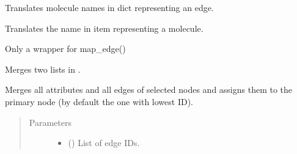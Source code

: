 \documentclass[letterpaper,10pt,english]{sphinxmanual}
\begin{document}
\begin{fulllineitems}
\begin{fulllineitems}
\end{fulllineitems}


\begin{fulllineitems}
\label{\detokenize{main:pypath.main.PyPath.map_edge}}
Translates molecule names in dict representing an edge.

\end{fulllineitems}


\begin{fulllineitems}
\label{\detokenize{main:pypath.main.PyPath.map_item}}
Translates the name in item representing a molecule.

\end{fulllineitems}


\begin{fulllineitems}
\label{\detokenize{main:pypath.main.PyPath.map_list}}
Only a wrapper for map\_edge()

\end{fulllineitems}


\begin{fulllineitems}
\label{\detokenize{main:pypath.main.PyPath.merge_lists}}
Merges two lists in .

\end{fulllineitems}


\begin{fulllineitems}
\label{\detokenize{main:pypath.main.PyPath.merge_nodes}}
Merges all attributes and all edges of selected nodes
and assigns them to the primary node
(by default the one with lowest ID).
\begin{quote}\begin{description}
\item[{Parameters}] \leavevmode\begin{itemize}
\item {} 
 () \textendash{} List of edge IDs.


\end{itemize}
\end{description}
\end{quote}
\end{fulllineitems}
\end{fulllineitems}
\end{document}
